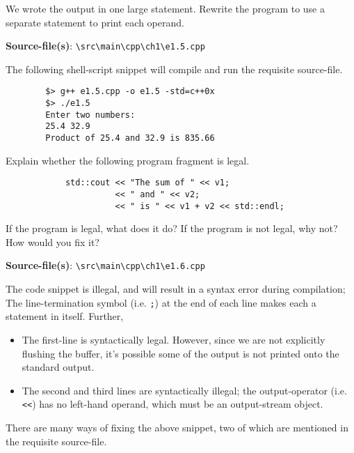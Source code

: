 \documentclass[12pt, a4paper]{article}
\begin{document}
    \bigskip
    \begin{tcolorbox}[title={Exercise: 1.5}]
        We wrote the output in one large statement.
        Rewrite the program to use a separate statement to print each operand.
    \end{tcolorbox}
    \noindent\textbf{Source-file(s)}: \texttt{\textbackslash src\textbackslash main\textbackslash cpp\textbackslash ch1\textbackslash e1.5.cpp}

    \noindent The following shell-script snippet will compile and run the requisite source-file.
    \begin{verbatim}
        $> g++ e1.5.cpp -o e1.5 -std=c++0x
        $> ./e1.5
        Enter two numbers:
        25.4 32.9
        Product of 25.4 and 32.9 is 835.66
    \end{verbatim}

    \bigskip
    \begin{tcolorbox}[title={Exercise: 1.6}]
        Explain whether the following program fragment is legal.

        \begin{verbatim}
            std::cout << "The sum of " << v1;
                      << " and " << v2;
                      << " is " << v1 + v2 << std::endl;
        \end{verbatim}

        If the program is legal, what does it do?
        If the program is not legal, why not?
        How would you fix it?
    \end{tcolorbox}
    \noindent\textbf{Source-file(s)}: \texttt{\textbackslash src\textbackslash main\textbackslash cpp\textbackslash ch1\textbackslash e1.6.cpp}

    \noindent The code snippet is illegal, and will result in a syntax error during compilation;
    The line-termination symbol (i.e. \texttt{;}) at the end of each line makes each a statement in itself.
    Further,
    \begin{itemize}
        \item {The first-line is syntactically legal. However, since we are not explicitly flushing the buffer, it's possible some of the output is not printed onto the standard output.}
        \item {The second and third lines are syntactically illegal; the output-operator (i.e. \texttt{<<}) has no left-hand operand, which must be an output-stream object.}
    \end{itemize}

    \noindent There are many ways of fixing the above snippet, two of which are mentioned in the requisite source-file.
\end{document}
